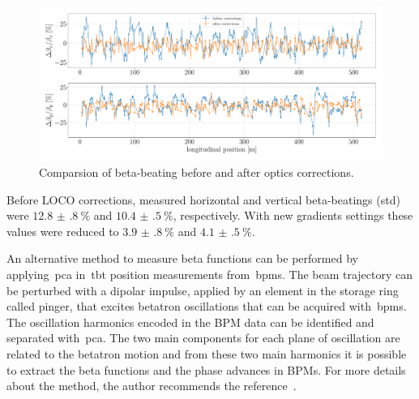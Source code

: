 \begin{figure}
\centering
\includegraphics[width=1.0\textwidth]{figures/beta_beating_progress_big.pdf}
\caption{Comparsion of beta-beating before and after optics corrections.}
\label{fig:beta_beating_progress}
\end{figure}

Before LOCO corrections, measured horizontal and vertical beta-beatings (std) were $\SI{12.8(8)}{\%}$ and $\SI{10.4(5)}{\%}$, respectively. With new gradients settings these values were reduced to $\SI{3.9(8)}{\%}$ and $\SI{4.1(5)}{\%}$.

An alternative method to measure beta functions can be performed by applying~\gls{pca} in~\gls{tbt} position measurements from~\glspl{bpm}. The beam trajectory can be perturbed with a dipolar impulse, applied by an element in the storage ring called pinger, that excites betatron oscillations that can be acquired with~\glspl{bpm}. The oscillation harmonics encoded in the BPM data can be identified and separated with~\gls{pca}. The two main components for each plane of oscillation are related to the betatron motion and from these two main harmonics it is possible to extract the beta functions and the phase advances in BPMs. For more details about the method, the author recommends the reference~\cite{huang2019beam}.

